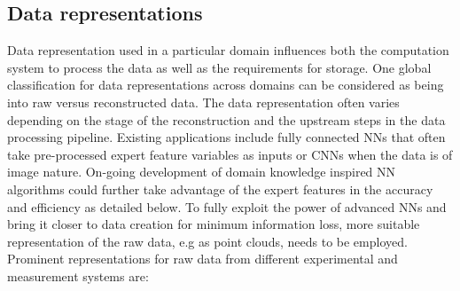 \subsection{Data representations}
Data representation used in a particular domain influences both the computation system to process the data as well as the requirements for storage. One global classification for data representations across domains can be considered as being into raw versus reconstructed data. The data representation often varies depending on the stage of the reconstruction and the upstream steps in the data processing pipeline. Existing applications include fully connected NNs that often take pre-processed expert feature variables as inputs or CNNs when the data is of image nature. On-going development of domain knowledge inspired NN algorithms could further take advantage of the expert features in the accuracy and efficiency as detailed below.
To fully exploit the power of advanced NNs and bring it closer to data creation for minimum information loss, more suitable representation of the raw data, e.g as point clouds, needs to be employed. Prominent representations for raw data from different experimental and measurement systems are:
